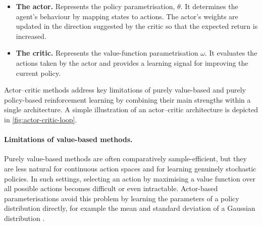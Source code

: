 \begin{itemize}
  \item \textbf{The actor.} Represents the policy parametrisation, $\theta$. It determines the agent's behaviour by mapping states to actions. The actor's weights are updated in the direction suggested by the critic so that the expected return is increased.
  \item \textbf{The critic.} Represents the value-function parametrisation $\omega$. It evaluates the actions taken by the actor and provides a learning signal for improving the current policy.
\end{itemize}
Actor--critic methods address key limitations of purely value-based and purely policy-based reinforcement learning by combining their main strengths within a single architecture. A simple illustration of an actor--critic architecture is depicted in \autoref{fig:actor-critic-loop}.

\paragraph{Limitations of value-based methods.}
Purely value-based methods are often comparatively sample-efficient, but they are less natural for continuous action spaces and for learning genuinely stochastic policies. In such settings, selecting an action by maximising a value function over all possible actions becomes difficult or even intractable. Actor-based parameterisations avoid this problem by learning the parameters of a policy distribution directly, for example the mean and standard deviation of a Gaussian distribution \cite{sutton_reinforcement_2020, lillicrap_continuous_2019}.

